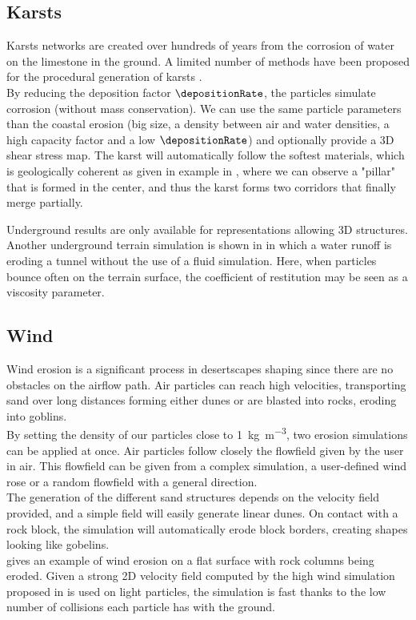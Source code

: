 \subsection{Karsts} 
Karsts networks are created over hundreds of years from the corrosion of water on the limestone in the ground. A limited number of methods have been proposed for the procedural generation of karsts \cite{Paris2021}.\\ 
By reducing the deposition factor $\depositionRate$, the particles simulate corrosion (without mass conservation). We can use the same particle parameters than the coastal erosion (big size, a density between air and water densities, a high capacity factor and a low $\depositionRate$) and optionally provide a 3D shear stress map. The karst will automatically follow the softest materials, which is geologically coherent as given in example in , where we can observe a "pillar" that is formed in the center, and thus the karst forms two corridors that finally merge partially. 

Underground results are only available for representations allowing 3D structures. Another underground terrain simulation is shown in  in which a water runoff is eroding a tunnel without the use of a fluid simulation. Here, when particles bounce often on the terrain surface, the coefficient of restitution may be seen as a viscosity parameter.

\subsection{Wind}
Wind erosion is a significant process in desertscapes shaping since there are no obstacles on the airflow path. Air particles can reach high velocities, transporting sand over long distances forming either dunes or are blasted into rocks, eroding into goblins. \\ 
By setting the density of our particles close to \SI{1}{\kilogram\per\cubic\meter}, two erosion simulations can be applied at once. Air particles follow closely the flowfield given by the user in air. This flowfield can be given from a complex simulation, a user-defined wind rose \cite{Paris2019b} or a random flowfield with a general direction. \\ 
The generation of the different sand structures depends on the velocity field provided, and a simple field will easily generate linear dunes. On contact with a rock block, the simulation will automatically erode block borders, creating shapes looking like gobelins. \\
 gives an example of wind erosion on a flat surface with rock columns being eroded. Given a strong 2D velocity field computed by the high wind simulation proposed in \cite{Paris2019b} is used on light particles, the simulation is fast thanks to the low number of collisions each particle has with the ground. 

